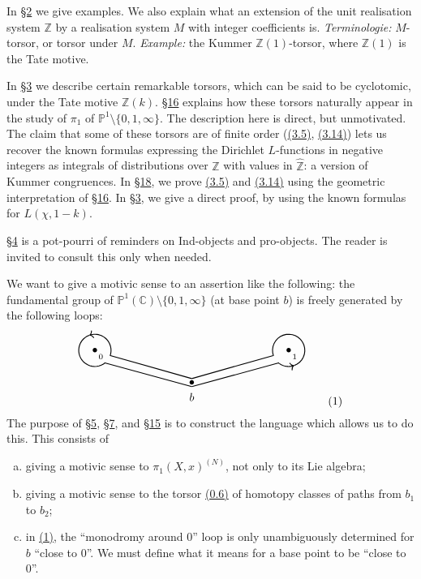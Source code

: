 \documentclass{article}
\theoremstyle{definition}
\newcommand{\bb}{\mathbb}
\newcommand{\PP}{\bb{P}}
\newcommand{\ZZ}{\bb{Z}}
\newcommand{\hZZ}{\widehat{\bb{Z}}}
\newcommand{\CC}{\bb{C}}
\newcommand{\oldpage}[1]{\marginpar{\footnotesize$\Big\vert$ \textit{p.~#1}}}
\begin{document}
In \hyperref[2]{\S2} we give examples.
We also explain what an extension of the unit realisation system $\ZZ$ by a realisation system $M$ with integer coefficients is.
\emph{Terminologie:} $M$-torsor, or torsor under $M$.
\emph{Example:} the Kummer $\ZZ(1)$-torsor, where $\ZZ(1)$ is the Tate motive.

In \hyperref[3]{\S3} we describe certain remarkable torsors, which can be said to be cyclotomic, under the Tate motive $\ZZ(k)$.
\hyperref[16]{\S16} explains how these torsors naturally appear in the study of $\pi_1$ of $\PP^1\setminus\{0,1,\infty\}$.
The description here is direct, but unmotivated.
The claim that some of these torsors are of finite order (\hyperref[3.5]{(3.5)}, \hyperref[3.14]{(3.14)}) lets us recover the known formulas expressing the Dirichlet $L$-functions in negative integers as integrals of distributions over $\hZZ$ with values in $\hZZ$: a version of Kummer congruences.
In \hyperref[18]{\S18}, we prove \hyperref[3.5]{(3.5)} and \hyperref[3.14]{(3.14)} using the geometric interpretation of \hyperref[16]{\S16}.
In \hyperref[3]{\S3}, we give a direct proof, by using the known formulas for $L(\chi,1-k)$.

\hyperref[4]{\S4} is a pot-pourri of reminders on Ind-objects and pro-objects.
The reader is invited to consult this only when needed.

We want to give a motivic sense to an assertion like the following: the fundamental group of $\PP^1(\CC)\setminus\{0,1,\infty\}$ (at base point $b$) is freely generated by the following loops:
\[
\label{figure1}
  \begin{tikzpicture}
    \node[label=below:{$b$}] at (0,0) {$\bullet$};
    \node[label={[label distance=-3mm]below right:{\scriptsize$1$}}] at (3,1) {$\bullet$};
    \node[label={[label distance=-3mm]below right:{\scriptsize$0$}}] at (-3,1) {$\bullet$};
    \draw[thick,domain=-20:110,->] plot ({0.5*cos(\x)-3}, {0.5*sin(\x)+1});
    \draw[thick,domain=110:310] plot ({0.5*cos(\x)-3}, {0.5*sin(\x)+1});
    \draw[thick,domain=-130:-70,->] plot ({0.5*cos(\x)+3}, {0.5*sin(\x)+1});
    \draw[thick,domain=-70:200] plot ({0.5*cos(\x)+3}, {0.5*sin(\x)+1});
    \draw[thick] (0,0.125) to (-2.52,0.84);
    \draw[thick] (0,0.125) to (2.52,0.84);
    \draw[thick] (0,-0.125) to (-2.69,0.61);
    \draw[thick] (0,-0.125) to (2.69,0.61);
  \end{tikzpicture}
\tag{1}
\]
The purpose of \hyperref[5]{\S5}, \hyperref[7]{\S7}, and \hyperref[15]{\S15} is to construct the language which allows us to do this.
This consists of
\begin{enumerate}[(a)]
  \item giving a motivic sense to $\pi_1(X,x)^{(N)}$, not only to its Lie algebra;
  \item giving a motivic sense to the torsor \hyperref[0.6]{(0.6)} of homotopy classes of paths from $b_1$ to $b_2$;
  \item in \hyperref[figure1]{(1)}, the ``monodromy around $0$'' loop is only unambiguously determined
\oldpage{7~(85)}
    for $b$ ``close to $0$''.
    We must define what it means for a base point to be ``close to $0$''.
\end{enumerate}
\end{document}
